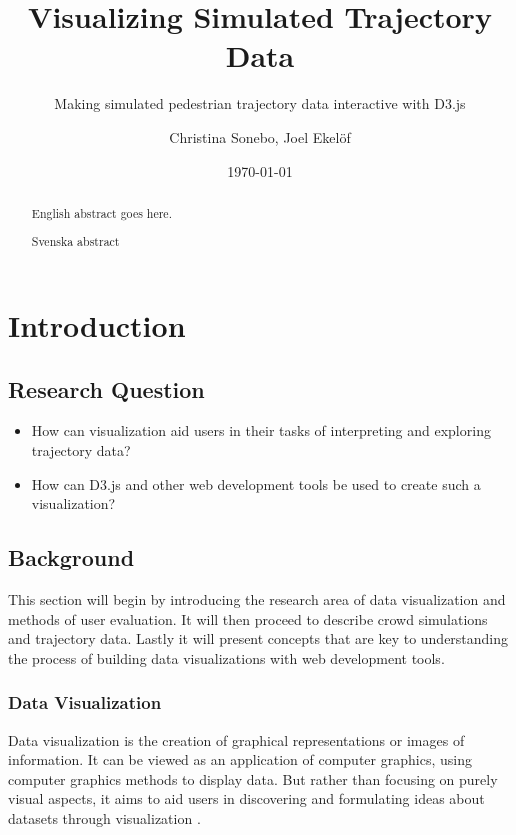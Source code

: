 \documentclass{kththesis}
\title{Visualizing Simulated Trajectory Data}
\subtitle{Making simulated pedestrian trajectory data interactive with D3.js}
\author{Christina Sonebo, Joel Ekelöf}
\date{\today}
\begin{document}

\titlepage

\begin{abstract}
  English abstract goes here.

\end{abstract}


\begin{otherlanguage}{swedish}
  \begin{abstract}
Svenska abstract
  \end{abstract}
\end{otherlanguage}


\tableofcontents


\mainmatter


\chapter{Introduction}

\section{Research Question}

\begin{itemize}
    \item How can visualization aid users in their tasks of interpreting and exploring trajectory data?
    \item How can D3.js and other web development tools be used to create such a visualization?
\end{itemize}


\section{Background}


This section will begin by introducing the research area of data visualization and methods of user evaluation. It will then proceed to describe crowd simulations and trajectory data. Lastly it will present concepts that are key to understanding the process of building data visualizations with web development tools.


\subsection{Data Visualization}

Data visualization is the creation of graphical representations or images of information. It can be viewed as an application of computer graphics, using computer graphics methods to display data. But rather than focusing on purely visual aspects, it aims to aid users in discovering and formulating ideas about datasets through visualization \cite{Chad}.
\end{document}
